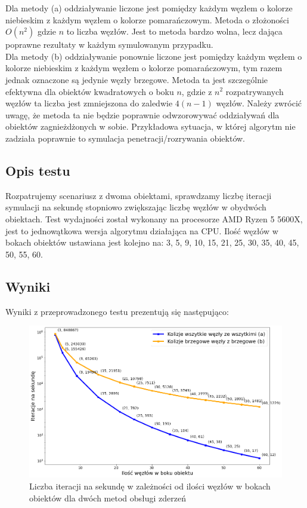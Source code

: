 \documentclass[12pt, letterpaper]{report}
\begin{document}
    Dla metody (a) oddziaływanie liczone jest pomiędzy każdym węzłem o kolorze niebieskim z każdym węzłem o
    kolorze pomarańczowym. Metoda o złożoności $O(n^2)$ gdzie $n$ to liczba węzłów.
    Jest to metoda bardzo wolna, lecz dająca poprawne rezultaty w każdym symulowanym przypadku.\\

    Dla metody (b) oddziaływanie ponownie liczone jest pomiędzy każdym węzłem o kolorze niebieskim z każdym
    węzłem o kolorze pomarańczowym, tym razem jednak oznaczone są jedynie węzły brzegowe.
    Metoda ta jest szczególnie efektywna dla obiektów kwadratowych o boku $n$, gdzie z $n^2$
    rozpatrywanych węzłów ta liczba jest zmniejszona do zaledwie $4(n-1)$ węzłów.
    Należy zwrócić uwagę, że metoda ta nie będzie poprawnie odwzorowywać oddziaływań dla
    obiektów zagnieżdżonych w sobie. Przykładowa sytuacja, w której algorytm nie zadziała poprawnie
    to symulacja penetracji/rozrywania obiektów.

    \subsection{Opis testu}
    Rozpatrujemy scenariusz z dwoma obiektami, sprawdzamy liczbę iteracji symulacji na sekundę stopniowo
    zwiększając liczbę węzłów w obydwóch obiektach.
    Test wydajności został wykonany na procesorze AMD Ryzen 5 5600X, 
    jest to jednowątkowa wersja algorytmu działająca na CPU.
    Ilość węzłów w bokach obiektów ustawiana jest kolejno na: 
    3, 5, 9, 10, 15, 21, 25, 30, 35, 40, 45, 50, 55, 60.
    
    \subsection{Wyniki}
    Wyniki z przeprowadzonego testu prezentują się następująco:
    \begin{figure}[H]
        \centering
        \includegraphics[width=15cm]{performance_side_size}
        \caption{
            Liczba iteracji na sekundę w zależności od 
            ilości węzłów w bokach obiektów dla dwóch metod obsługi zderzeń
        }
    \end{figure}
\end{document}
